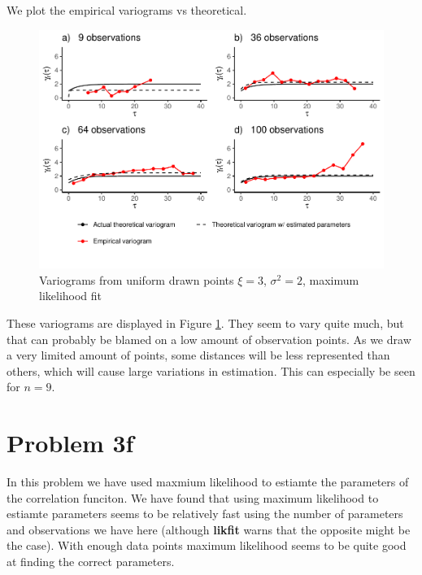 \documentclass[]{article}
\begin{document}
We plot the empirical variograms vs theoretical.

\begin{figure}
\centering
\includegraphics{Exercise-1_files/figure-latex/unnamed-chunk-8-1.pdf}
\caption{\label{fig:fig3d2} Variograms from uniform drawn points
\(\xi = 3\), \(\sigma^2 = 2\), maximum likelihood fit}
\end{figure}

These variograms are displayed in Figure \ref{fig:fig3d2}. They seem to
vary quite much, but that can probably be blamed on a low amount of
observation points. As we draw a very limited amount of points, some
distances will be less represented than others, which will cause large
variations in estimation. This can especially be seen for \(n=9\).

\hypertarget{problem-3f}{%
\section{Problem 3f}\label{problem-3f}}

In this problem we have used maxmium likelihood to estiamte the
parameters of the correlation funciton. We have found that using maximum
likelihood to estiamte parameters seems to be relatively fast using the
number of parameters and observations we have here (although
\textbf{likfit} warns that the opposite might be the case). With enough
data points maximum likelihood seems to be quite good at finding the
correct parameters.
\end{document}
